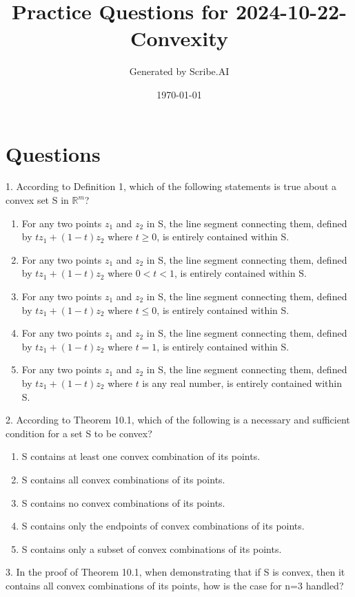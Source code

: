\documentclass{article}%
\title{Practice Questions for 2024{-}10{-}22{-}Convexity}%
\author{Generated by Scribe.AI}%
\date{\today}%
\begin{document}
%
\normalsize%
\maketitle%
\section{Questions}%
\label{sec:Questions}%
1. According to Definition 1, which of the following statements is true about a convex set S in $\mathbb{R}^m$?%
\begin{enumerate}[label=\Alph*.]%
\item For any two points $z_1$ and $z_2$ in S, the line segment connecting them, defined by $tz_1 + (1-t)z_2$ where $t \ge 0$, is entirely contained within S.%
\item For any two points $z_1$ and $z_2$ in S, the line segment connecting them, defined by $tz_1 + (1-t)z_2$ where $0 < t < 1$, is entirely contained within S.%
\item For any two points $z_1$ and $z_2$ in S, the line segment connecting them, defined by $tz_1 + (1-t)z_2$ where $t \le 0$, is entirely contained within S.%
\item For any two points $z_1$ and $z_2$ in S, the line segment connecting them, defined by $tz_1 + (1-t)z_2$ where $t = 1$, is entirely contained within S.%
\item For any two points $z_1$ and $z_2$ in S, the line segment connecting them, defined by $tz_1 + (1-t)z_2$ where $t$ is any real number, is entirely contained within S.%
\end{enumerate}%
\vspace{1em}%
2. According to Theorem 10.1, which of the following is a necessary and sufficient condition for a set S to be convex?%
\begin{enumerate}[label=\Alph*.]%
\item S contains at least one convex combination of its points.%
\item S contains all convex combinations of its points.%
\item S contains no convex combinations of its points.%
\item S contains only the endpoints of convex combinations of its points.%
\item S contains only a subset of convex combinations of its points.%
\end{enumerate}%
\vspace{1em}%
3. In the proof of Theorem 10.1, when demonstrating that if S is convex, then it contains all convex combinations of its points, how is the case for n=3 handled?%
\end{document}
